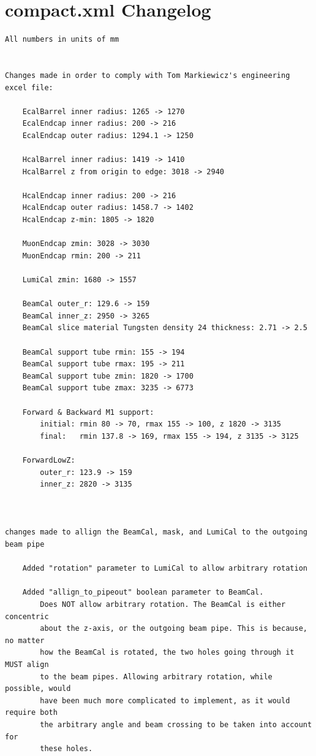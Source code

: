 \documentclass{report}
\begin{document}
\section{compact.xml Changelog} \label{sect__compact_changes}
\begin{verbatim}
All numbers in units of mm


Changes made in order to comply with Tom Markiewicz's engineering excel file:

    EcalBarrel inner radius: 1265 -> 1270
    EcalEndcap inner radius: 200 -> 216
    EcalEndcap outer radius: 1294.1 -> 1250

    HcalBarrel inner radius: 1419 -> 1410
    HcalBarrel z from origin to edge: 3018 -> 2940

    HcalEndcap inner radius: 200 -> 216
    HcalEndcap outer radius: 1458.7 -> 1402
    HcalEndcap z-min: 1805 -> 1820

    MuonEndcap zmin: 3028 -> 3030
    MuonEndcap rmin: 200 -> 211

    LumiCal zmin: 1680 -> 1557

    BeamCal outer_r: 129.6 -> 159
    BeamCal inner_z: 2950 -> 3265
    BeamCal slice material Tungsten density 24 thickness: 2.71 -> 2.5
    
    BeamCal support tube rmin: 155 -> 194
    BeamCal support tube rmax: 195 -> 211
    BeamCal support tube zmin: 1820 -> 1700
    BeamCal support tube zmax: 3235 -> 6773

    Forward & Backward M1 support:
        initial: rmin 80 -> 70, rmax 155 -> 100, z 1820 -> 3135
        final:   rmin 137.8 -> 169, rmax 155 -> 194, z 3135 -> 3125

    ForwardLowZ:
        outer_r: 123.9 -> 159
        inner_z: 2820 -> 3135



changes made to allign the BeamCal, mask, and LumiCal to the outgoing beam pipe

    Added "rotation" parameter to LumiCal to allow arbitrary rotation

    Added "allign_to_pipeout" boolean parameter to BeamCal. 
        Does NOT allow arbitrary rotation. The BeamCal is either concentric 
        about the z-axis, or the outgoing beam pipe. This is because, no matter
        how the BeamCal is rotated, the two holes going through it MUST align 
        to the beam pipes. Allowing arbitrary rotation, while possible, would
        have been much more complicated to implement, as it would require both
        the arbitrary angle and beam crossing to be taken into account for 
        these holes.


\end{verbatim}
\end{document}
